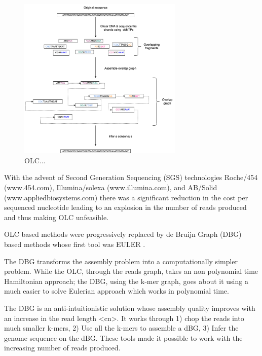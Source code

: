 \documentclass[11pt]{article}
\begin{document}
\begin{figure}[H]
\centering
\includegraphics[width=0.7\textwidth]{assets/images/OLC framework.png}
\caption{OLC...}
\end{figure}

With the advent of Second Generation Sequencing (SGS) technologies 
Roche/454 (www.454.com), Illumina/solexa (www.illumina.com),
and AB/Solid (www.appliedbiosystems.com) there was a significant reduction in 
the cost per sequenced nucleotide \cite{liComparisonTwoMajor2012} leading to an 
explosion in the number of reads produced and thus making OLC unfeasible. 

OLC based methods were progressively replaced by de Bruijn Graph (DBG)
\cite{iduryNewAlgorithmDNA1995} based methods whose first tool was EULER
\cite{pevznerEulerianPathApproach2001}.

The DBG transforms the assembly problem into a computationally simpler problem.
While the OLC, through the reads graph, takes an non polynomial time Hamiltonian 
approach; the DBG, using the k-mer graph, goes about it using a much easier to
solve Eulerian approach which works in polynomial time.
\cite{liComparisonTwoMajor2012,pevznerEulerianPathApproach2001} 

The DBG is an anti-intuitionistic solution whose assembly quality improves with 
an increase in the read length <cn>. It works through 1) chop the reads into
much smaller k-mers, 2) Use all the k-mers to assemble a dBG, 3) Infer the 
genome sequence on the dBG. These tools made it possible to work with the 
increasing number of reads produced. 
\end{document}
